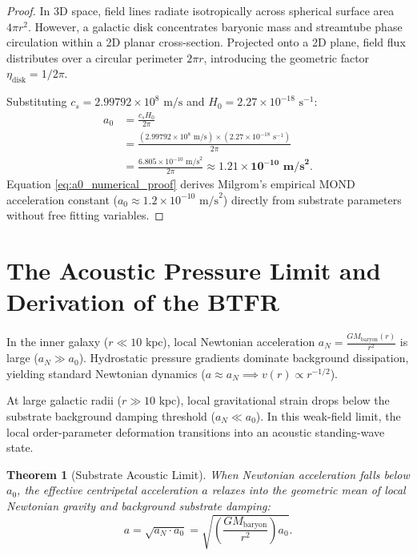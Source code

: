 \documentclass[11pt,a4paper]{article}
\newtheorem{thm}{Theorem}
\begin{document}
	\begin{proof}
		In 3D space, field lines radiate isotropically across spherical surface area $4\pi r^2$. However, a galactic disk concentrates baryonic mass and streamtube phase circulation within a 2D planar cross-section. Projected onto a 2D plane, field flux distributes over a circular perimeter $2\pi r$, introducing the geometric factor $\eta_{\text{disk}} = 1/2\pi$.
		
		Substituting $c_s = 2.99792 \times 10^8 \text{ m/s}$ and $H_0 = 2.27 \times 10^{-18} \text{ s}^{-1}$:
		\begin{align}
			a_0 &= \frac{c_s H_0}{2\pi} \nonumber \\
			&= \frac{(2.99792 \times 10^8 \text{ m/s}) \times (2.27 \times 10^{-18} \text{ s}^{-1})}{2\pi} \nonumber \\
			&= \frac{6.805 \times 10^{-10} \text{ m/s}^2}{2\pi} \approx \mathbf{1.21 \times 10^{-10} \text{ m/s}^2}.
			\label{eq:a0_numerical_proof}
		\end{align}
		Equation \eqref{eq:a0_numerical_proof} derives Milgrom's empirical MOND acceleration constant ($a_0 \approx 1.2 \times 10^{-10} \text{ m/s}^2$) directly from substrate parameters without free fitting variables.
	\end{proof}
	
	\section{The Acoustic Pressure Limit and Derivation of the BTFR}
	\label{sec:btfr_derivation}
	
	In the inner galaxy ($r \ll 10 \text{ kpc}$), local Newtonian acceleration $a_N = \frac{G M_{\text{baryon}}(r)}{r^2}$ is large ($a_N \gg a_0$). Hydrostatic pressure gradients dominate background dissipation, yielding standard Newtonian dynamics ($a \approx a_N \implies v(r) \propto r^{-1/2}$).
	
	At large galactic radii ($r \gg 10 \text{ kpc}$), local gravitational strain drops below the substrate background damping threshold ($a_N \ll a_0$). In this weak-field limit, the local order-parameter deformation transitions into an acoustic standing-wave state.
	
	\begin{thm}[Substrate Acoustic Limit]
		\label{thm:acoustic_limit}
		When Newtonian acceleration falls below $a_0$, the effective centripetal acceleration $a$ relaxes into the geometric mean of local Newtonian gravity and background substrate damping:
		\begin{equation}
			a = \sqrt{a_N \cdot a_0} = \sqrt{\left(\frac{G M_{\text{baryon}}}{r^2}\right) a_0}.
			\label{eq:acoustic_limit_acceleration}
		\end{equation}
	\end{thm}
	
\end{document}
